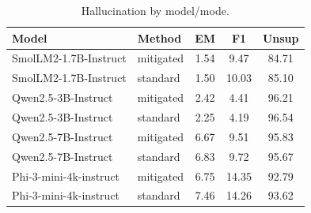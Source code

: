 \begin{table}[t]\centering\small
\begin{tabular}{llccc}
\toprule
Model & Method & EM & F1 & Unsup \\
\midrule
SmolLM2-1.7B-Instruct & mitigated & 1.54 & 9.47 & 84.71 \\
SmolLM2-1.7B-Instruct & standard & 1.50 & 10.03 & 85.10 \\
Qwen2.5-3B-Instruct & mitigated & 2.42 & 4.41 & 96.21 \\
Qwen2.5-3B-Instruct & standard & 2.25 & 4.19 & 96.54 \\
Qwen2.5-7B-Instruct & mitigated & 6.67 & 9.51 & 95.83 \\
Qwen2.5-7B-Instruct & standard & 6.83 & 9.72 & 95.67 \\
Phi-3-mini-4k-instruct & mitigated & 6.75 & 14.35 & 92.79 \\
Phi-3-mini-4k-instruct & standard & 7.46 & 14.26 & 93.62 \\
\bottomrule
\end{tabular}
\caption{Hallucination by model/mode.}
\end{table}
